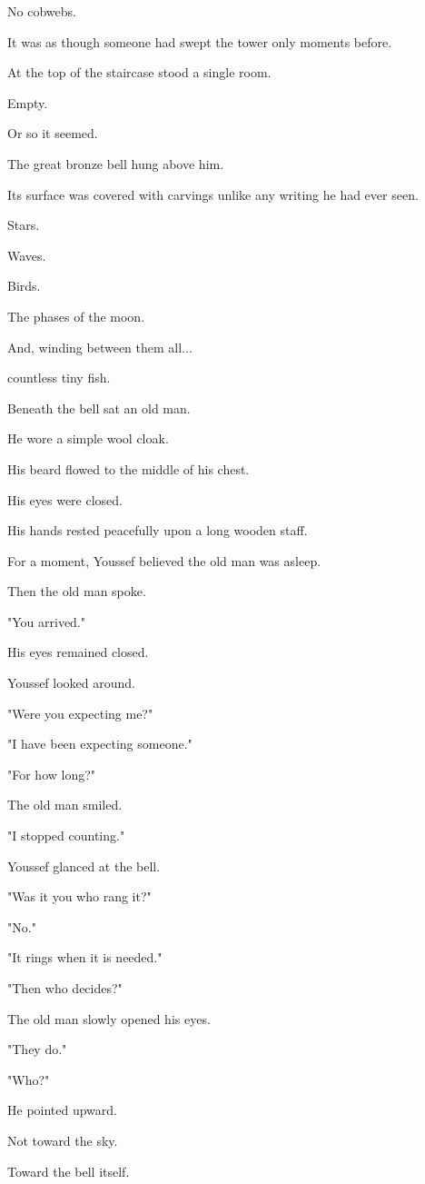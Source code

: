 \documentclass[12pt,openany]{book}
\begin{document}
No cobwebs.

It was as though someone had swept the tower only moments before.

At the top of the staircase stood a single room.

Empty.

Or so it seemed.

The great bronze bell hung above him.

Its surface was covered with carvings unlike any writing he had ever seen.

Stars.

Waves.

Birds.

The phases of the moon.

And, winding between them all...

countless tiny fish.

Beneath the bell sat an old man.

He wore a simple wool cloak.

His beard flowed to the middle of his chest.

His eyes were closed.

His hands rested peacefully upon a long wooden staff.

For a moment, Youssef believed the old man was asleep.

Then the old man spoke.

"You arrived."

His eyes remained closed.

Youssef looked around.

"Were you expecting me?"

"I have been expecting someone."

"For how long?"

The old man smiled.

"I stopped counting."

Youssef glanced at the bell.

"Was it you who rang it?"

"No."

"It rings when it is needed."

"Then who decides?"

The old man slowly opened his eyes.

"They do."

"Who?"

He pointed upward.

Not toward the sky.

Toward the bell itself.
\end{document}
